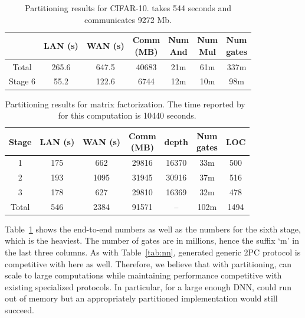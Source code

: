\setlength\tabcolsep{6pt}
\begin{table}
\footnotesize
\begin{tabular}{|c|c|c|c |c|c|c|}
\hline
           &  LAN (s) & WAN (s) & \thead{Comm \\ (MB)}  & \thead{Num \\ And} & \thead{Num \\ Mul} & \thead{Num \\ gates} \\
\hline
Total      &  265.6       & 647.5        & 40683       & 21m    & 61m    &  337m  \\
\hline
Stage 6    &  55.2        & 122.6        & 6744        & 12m    & 10m   &  98m  \\
\hline
\end{tabular}

 \caption{Partitioning results for CIFAR-10. \minion takes 544 seconds and communicates 9272 Mb.}
 \label{tab:cifar} 
\end{table}

\begin{table}[t]
\footnotesize
\begin{tabular}{|c|c|c|c |c|c| c|}
\hline
  Stage         &  LAN (s) & WAN (s) & \thead{Comm \\ (MB)}  & depth & \thead{Num \\ gates} & LOC\\
\hline
1    &  175       & 662        & 29816       & 16370    & 33m    & 500  \\
\hline
2    &  193        & 1095        & 31945        & 30916    & 37m & 516 \\
\hline
3    &  178        & 627        & 29810        & 16369    & 32m  & 478  \\
\hline
Total    &  546      & 2384        & 91571        & --    & 102m & 1494 \\
\hline
\end{tabular}

 \caption{Partitioning results for matrix factorization. The time reported by~\cite{valeriaMatrix} for this computation is 10440 seconds.}
 \label{tab:factor} 
\end{table}
Table~\ref{tab:cifar} shows the end-to-end numbers as
well as the numbers for the sixth stage, which is the heaviest. 
The number of gates are in millions, hence the suffix `m' in the last
three columns.
As with Table~\ref{tab:nn}, \tool generated generic 2PC protocol is
competitive with \minion here as well. Therefore,
we believe that with partitioning, \tool can scale to large
computations while maintaining performance
competitive with existing specialized protocols. In particular, for a
large enough DNN, \minion could run
out of memory but an appropriately partitioned \tool implementation would still
succeed.

